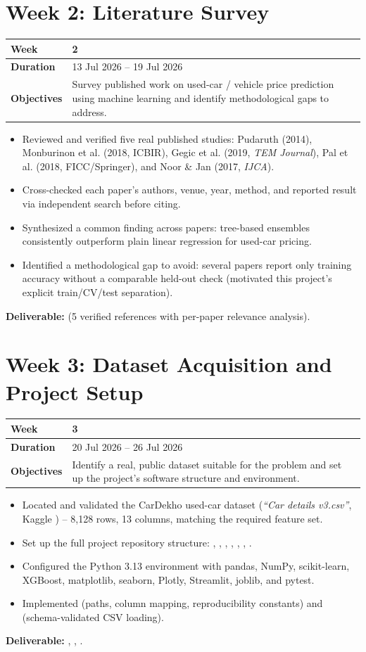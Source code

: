 \documentclass[12pt,a4paper]{report}
\newcommand{\weektable}[3]{%
\begin{longtable}{|p{3.6cm}|p{10.5cm}|}
\hline
\textbf{Week} & \textbf{#1} \\
\hline
\textbf{Duration} & #2 \\
\hline
\textbf{Objectives} & #3 \\
\hline
\end{longtable}
}
\begin{document}
\chapter{Week 2: Literature Survey}
\weektable{2}{13 Jul 2026 -- 19 Jul 2026}{Survey published work on used-car / vehicle price prediction using machine learning and identify methodological gaps to address.}

\begin{itemize}[nosep]
    \item Reviewed and verified five real published studies: Pudaruth (2014), Monburinon et al. (2018, ICBIR), Gegic et al. (2019, \textit{TEM Journal}), Pal et al. (2018, FICC/Springer), and Noor \& Jan (2017, \textit{IJCA}).
    \item Cross-checked each paper's authors, venue, year, method, and reported result via independent search before citing.
    \item Synthesized a common finding across papers: tree-based ensembles consistently outperform plain linear regression for used-car pricing.
    \item Identified a methodological gap to avoid: several papers report only training accuracy without a comparable held-out check (motivated this project's explicit train/CV/test separation).
\end{itemize}
\textbf{Deliverable:}  (5 verified references with per-paper relevance analysis).

\chapter{Week 3: Dataset Acquisition and Project Setup}
\weektable{3}{20 Jul 2026 -- 26 Jul 2026}{Identify a real, public dataset suitable for the problem and set up the project's software structure and environment.}

\begin{itemize}[nosep]
    \item Located and validated the CarDekho used-car dataset (\textit{``Car details v3.csv''}, Kaggle ) -- 8{,}128 rows, 13 columns, matching the required feature set.
    \item Set up the full project repository structure: , , , , , , .
    \item Configured the Python 3.13 environment with pandas, NumPy, scikit-learn, XGBoost, matplotlib, seaborn, Plotly, Streamlit, joblib, and pytest.
    \item Implemented  (paths, column mapping, reproducibility constants) and  (schema-validated CSV loading).
\end{itemize}
\textbf{Deliverable:} , , .
\end{document}
